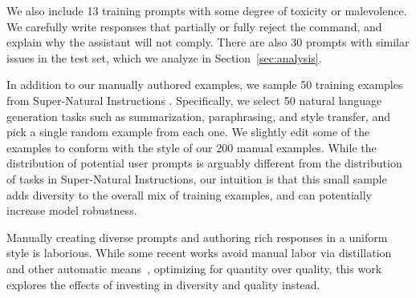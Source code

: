 We also include 13 training prompts with some degree of toxicity or malevolence.
We carefully write responses that partially or fully reject the command, and explain why the assistant will not comply.
There are also 30 prompts with similar issues in the test set, which we analyze in Section~\ref{sec:analysis}.

In addition to our manually authored examples, we sample 50 training examples from Super-Natural Instructions \citep{supernaturalinstructions}.
Specifically, we select 50 natural language generation tasks such as summarization, paraphrasing, and style transfer, and pick a single random example from each one.
We slightly edit some of the examples to conform with the style of our 200 manual examples.
While the distribution of potential user prompts is arguably different from the distribution of tasks in Super-Natural Instructions, our intuition is that this small sample adds diversity to the overall mix of training examples, and can potentially increase model robustness.

Manually creating diverse prompts and authoring rich responses in a uniform style is laborious.
While some recent works avoid manual labor via distillation and other automatic means~\citep{honovich2022unnatural, wang2022selfinstruct, alpaca, vicuna2023, sun2023principledriven}, optimizing for quantity over quality, this work explores the effects of investing in diversity and quality instead.